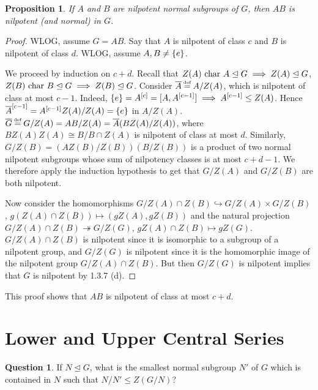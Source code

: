 \documentclass[11pt]{book}
\newcounter{counter}
\newtheorem{proposition}[counter]{Proposition}   \newtheorem{problem}[counter]{Problem}   \newtheorem*{proposition*}{Proposition}   \newtheorem*{lemma*}{Lemma}
\theoremstyle{definition}   \newtheorem{defn}[counter]{Definition} %
\newtheorem*{question}{Question}   \newtheorem*{answer}{Answer}   \newtheorem{modification}[counter]{Modification}   \newtheorem{numitem}[counter]{}
\newcommand{\ov}{\overline}   \newcommand{\wt}{\widetilde}
\newcommand{\nsg}{\mathrel{\unlhd}}   \newcommand{\ind}{\parindent24pt}   \newcommand{\vn}{\varnothing}
\newcommand\myeq{\mathrel{\overset{\makebox[0pt]{\mbox{\normalfont\tiny\sffamily \textrm{def}}}}{=}}}
\newcommand{\vs}{\vspace{8pt}}
\numberwithin{counter}{chapter}
\begin{document}
\vs

\begin{proposition}
If $A$ and $B$ are nilpotent normal subgroups of $G$, then $AB$ is nilpotent (and normal) in $G$.
\end{proposition}

\begin{proof}
WLOG, assume $G = AB$. Say that $A$ is nilpotent of class $c$ and $B$ is nilpotent of class $d$. WLOG, assume $A,B \ne \{e\}$.

We proceed by induction on $c+d$. Recall that $Z(A) \car A \nsg G \implies Z(A) \nsg G$, $Z(B) \car B \nsg G \implies Z(B) \nsg G$. Consider $\ov{A} \myeq A/Z(A)$, which is nilpotent of class at most $c-1$. Indeed, $\{e\} = A^{[c]} = [A,A^{[c-1]}] \implies A^{[c-1]} \leq Z(A)$. Hence $\lcs{\ov{A}}{c-1} = \lcs{A}{c-1}Z(A)/Z(A) = \{e\}$ in $A/Z(A)$. $\ov{G} \myeq G/Z(A) = AB/Z(A) = \ov{A}(BZ(A)/Z(A))$, where $BZ(A)Z(A) \cong B/B\cap Z(A)$ is nilpotent of class at most $d$. Similarly, $G/Z(B) = (AZ(B)/Z(B))(B/Z(B))$ is a product of two normal nilpotent subgroups whose sum of nilpotency classes is at most $c+d-1$. We therefore apply the induction hypothesis to get that $G/Z(A)$ and $G/Z(B)$ are both nilpotent.

Now consider the homomorphisms $G/Z(A)\cap Z(B) \hookrightarrow G/Z(A) \times G/Z(B)$, $g(Z(A)\cap Z(B)) \mapsto (gZ(A),gZ(B))$ and the natural projection $G/Z(A)\cap Z(B) \twoheadrightarrow G/Z(G)$, $gZ(A)\cap Z(B) \mapsto gZ(G)$. $G/Z(A)\cap Z(B)$ is nilpotent since it is isomorphic to a subgroup of a nilpotent group, and $G/Z(G)$ is nilpotent since it is the homomorphic image of the nilpotent group $G/Z(A)\cap Z(B)$. But then $G/Z(G)$ is nilpotent implies that $G$ is nilpotent by 1.3.7 (d).
\end{proof}

\vs

\begin{remark*}
This proof shows that $AB$ is nilpotent of class at most $c+d$.
\end{remark*}

\vs

\section*{Lower and Upper Central Series}

\vs

\begin{question}
If $N \nsg G$, what is the smallest normal subgroup $N'$ of $G$ which is contained in $N$ such that $N/N' \leq Z(G/N)$?
\end{question}
\end{document}
